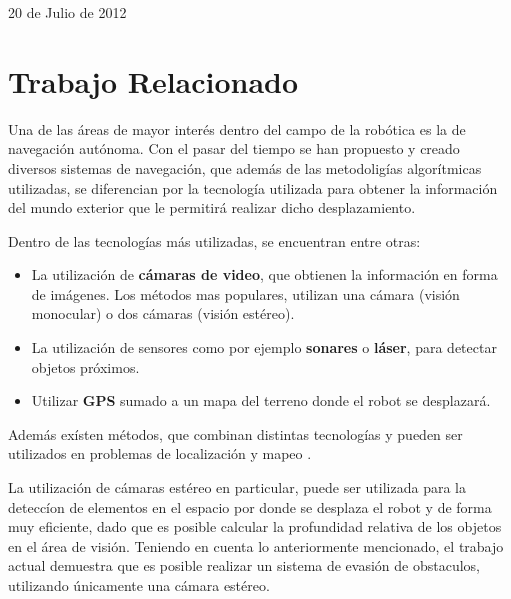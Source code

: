 \documentclass[journal]{IEEEtran}
\begin{document}
\hfill 20 de Julio de 2012

\section{Trabajo Relacionado}
\label{sec:trabajajo_relacionado}

Una de las \'areas de mayor inter\'es dentro del campo de la rob\'otica es la de navegaci\'on aut\'onoma. Con el pasar del tiempo se han propuesto y creado diversos sistemas de navegaci\'on, que adem\'as de las metodolig\'ias algor\'itmicas utilizadas, se diferencian por la tecnolog\'ia utilizada para obtener la informaci\'on del mundo exterior que le permitir\'a realizar dicho desplazamiento.

Dentro de las tecnolog\'ias m\'as utilizadas, se encuentran entre otras:

\begin{itemize}
	\item La utilizaci\'on de {\bf c\'amaras de video}, que obtienen la informaci\'on en forma de im\'agenes. Los m\'etodos mas populares, utilizan una c\'amara (visi\'on monocular) o dos c\'amaras (visi\'on est\'ereo).
	
	\item La utilizaci\'on de sensores como por ejemplo {\bf sonares} o {\bf l\'aser}, para detectar objetos pr\'oximos.
	
	\item Utilizar {\bf GPS} sumado a un mapa del terreno donde el robot se desplazar\'a.
\end{itemize}

Adem\'as ex\'isten m\'etodos, que combinan distintas tecnolog\'ias y pueden ser utilizados en problemas de localizaci\'on y mapeo \cite{KNG10}.

La utilizaci\'on de c\'amaras est\'ereo en particular, puede ser utilizada para la detecc\'ion de elementos en el espacio por donde se desplaza el robot y de forma muy eficiente, dado que es posible calcular la profundidad relativa de los objetos en el \'area de visi\'on. Teniendo en cuenta lo anteriormente mencionado, el trabajo actual demuestra que es posible realizar un sistema de evasi\'on de obstaculos, utilizando \'unicamente una c\'amara est\'ereo.
\end{document}
